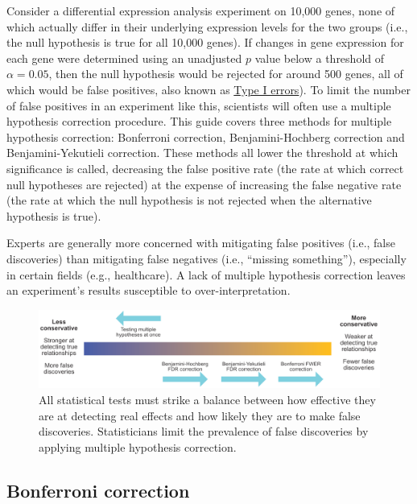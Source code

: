 \documentclass[letterpaper, 12pt]{article}
\begin{document}
Consider a differential expression analysis experiment on 10,000 genes, none of which actually differ in their underlying expression levels for the two groups (i.e., the null hypothesis is true for all 10,000 genes). If changes in gene expression for each gene were determined using an unadjusted $p$ value below a threshold of $\alpha = 0.05$, then the null hypothesis would be rejected for around 500 genes, all of which would be false positives, also known as \href{https://en.wikipedia.org/wiki/Type_I_and_type_II_errors}{Type I errors}). To limit the number of false positives in an experiment like this, scientists will often use a multiple hypothesis correction procedure. This guide covers three methods for multiple hypothesis correction: Bonferroni correction, Benjamini-Hochberg correction and Benjamini-Yekutieli correction. These methods all lower the threshold at which significance is called, decreasing the false positive rate (the rate at which correct null hypotheses are rejected) at the expense of increasing the false negative rate (the rate at which the null hypothesis is not rejected when the alternative hypothesis is true).

Experts are generally more concerned with mitigating false positives (i.e., false discoveries) than mitigating false negatives (i.e., ``missing something''), especially in certain fields (e.g., healthcare). A lack of multiple hypothesis correction leaves an experiment's results susceptible to over-interpretation.

\begin{figure}[h!tbp]
    \centering
    \includegraphics[width=\textwidth]{img/multiple_hypothesis_correction/fdr_diagram.png}
    \caption*{All statistical tests must strike a balance between how effective they are at detecting real effects and how likely they are to make false discoveries. Statisticians limit the prevalence of false discoveries by applying multiple hypothesis correction.}
\end{figure}

\subsection*{Bonferroni correction}
\end{document}
